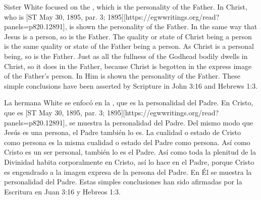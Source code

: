 \begin{table}[H]
\centering
\renewcommand{\arraystretch}{1.5}
\setlength{\tabcolsep}{15pt}
\end{table}


Sister White focused on the , which is the personality of the Father. In Christ, who is [ST May 30, 1895, par. 3; 1895][https://egwwritings.org/read?panels=p820.12891], is shown the personality of the Father. In the same way that Jesus is a person, so is the Father. The quality or state of Christ being a person is the same quality or state of the Father being a person. As Christ is a personal being, so is the Father. Just as all the fullness of the Godhead bodily dwells in Christ, so it does in the Father, because Christ is begotten in the express image of the Father’s person. In Him is shown the personality of the Father. These simple conclusions have been asserted by Scripture in John 3:16 and Hebrews 1:3.


La hermana White se enfocó en la , que es la personalidad del Padre. En Cristo, que es [ST May 30, 1895, par. 3; 1895][https://egwwritings.org/read?panels=p820.12891], se muestra la personalidad del Padre. Del mismo modo que Jesús es una persona, el Padre también lo es. La cualidad o estado de Cristo como persona es la misma cualidad o estado del Padre como persona. Así como Cristo es un ser personal, también lo es el Padre. Así como toda la plenitud de la Divinidad habita corporalmente en Cristo, así lo hace en el Padre, porque Cristo es engendrado a la imagen expresa de la persona del Padre. En Él se muestra la personalidad del Padre. Estas simples conclusiones han sido afirmadas por la Escritura en Juan 3:16 y Hebreos 1:3.


